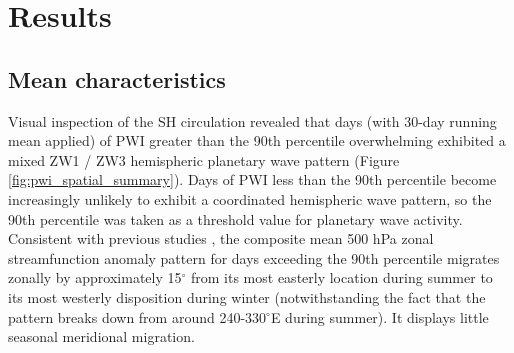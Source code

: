 \section{Results}

\subsection{Mean characteristics}\label{s:mean_characteristics}

Visual inspection of the SH circulation revealed that days (with 30-day running mean applied) of PWI greater than the 90th percentile overwhelming exhibited a mixed ZW1 / ZW3 hemispheric planetary wave pattern (Figure \ref{fig:pwi_spatial_summary}). Days of PWI less than the 90th percentile become increasingly unlikely to exhibit a coordinated hemispheric wave pattern, so the 90th percentile was taken as a threshold value for planetary wave activity. Consistent with previous studies \citep{vanLoon1984,Mo1985}, the composite mean 500 hPa zonal streamfunction anomaly pattern for days exceeding the 90th percentile migrates zonally by approximately 15$^{\circ}$ from its most easterly location during summer to its most westerly disposition during winter (notwithstanding the fact that the pattern breaks down from around 240-330$^{\circ}$E during summer). It displays little seasonal meridional migration.
